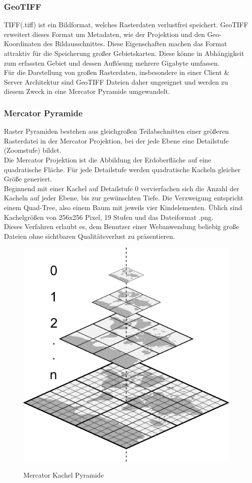 \documentclass[10pt,conference,compsocconf]{IEEEtran}
\begin{document}
\subsubsection{GeoTIFF}
TIFF(.tiff) ist ein Bildformat, welches Rasterdaten verlustfrei speichert. GeoTIFF erweitert dieses Format um Metadaten, wie der Projektion und den Geo-Koordinaten des Bildausschnittes. Diese Eigenschaften machen das Format attraktiv für die Speicherung großer Gebietskarten. Diese könne in Abhängigkeit zum erfassten Gebiet und dessen Auflösung mehrere Gigabyte umfassen. \\
Für die Darstellung von großen Rasterdaten, insbesondere in einer Client \& Server Architektur sind GeoTIFF Dateien daher ungeeignet und werden zu diesem Zweck in eine Mercator Pyramide umgewandelt.\\

\subsubsection{Mercator Pyramide}
Raster Pyramiden bestehen aus gleichgroßen Teilabschnitten einer größeren Rasterdatei in der Mercator Projektion, bei der jede Ebene eine Detailstufe (Zoomstufe) bildet. \\
Die Mercator Projektion ist die Abbildung der Erdoberfläche auf eine quadratische Fläche. Für jede Detailstufe werden quadratische Kacheln gleicher Größe generiert. \\
Beginnend mit einer Kachel auf Detailstufe 0 vervierfachen sich die Anzahl der Kacheln auf jeder Ebene, bis zur gewünschten Tiefe. Die Verzweigung entspricht einem Quad-Tree, also einem Baum mit jeweils vier Kindelementen. Üblich sind Kachelgrößen von 256x256 Pixel, 19 Stufen und das Dateiformat .png. \\
Dieses Verfahren erlaubt es, dem Benutzer einer Webanwendung beliebig große Dateien ohne sichtbaren Qualitätsverlust zu präsentieren.\\
\begin{figure}[H]
	\centering
	\includegraphics[width=0.6\columnwidth]{img/mercator_pyramid.png}\\
	\caption[]{Mercator Kachel Pyramide}
	\label{img:mercator_pyramid}
\end{figure}
\end{document}
